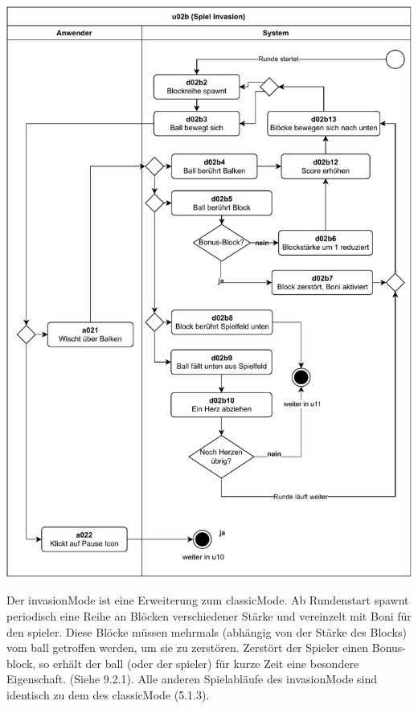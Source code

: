 \vspace*{1cm}

\includegraphics[width=\linewidth]{diagramme/pdf/UML-Activity-u02b.pdf}
\label{fig:dia:invasion}
\vspace*{0.5cm}


Der \gls{invasionMode} ist eine Erweiterung zum \gls{classicMode}. Ab Rundenstart spawnt periodisch eine Reihe an Blöcken verschiedener Stärke und vereinzelt mit Boni für den \gls{spieler}. Diese Blöcke müssen mehrmals (abhängig von der Stärke des Blocks) vom \gls{ball} getroffen werden, um sie zu zerstören. Zerstört der Spieler einen Bonus-\gls{block}, so erhält der \gls{ball} (oder der \gls{spieler}) für kurze Zeit eine besondere Eigenschaft. (Siehe 9.2.1). 
Alle anderen Spielabläufe des \gls{invasionMode} sind identisch zu dem des \gls{classicMode} (5.1.3).


